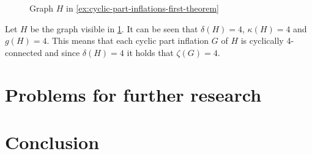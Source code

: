 \documentclass[12pt, twoside]{book}
\begin{document}
\begin{example}\label{ex:cyclic-part-inflations-first-theorem}
	\begin{figure}
		\centering
		\caption{Graph $H$ in \cref{ex:cyclic-part-inflations-first-theorem}}
		\label{fig:cyclic-part-inflations-ex-2-before}
	\end{figure}

	Let $H$ be the graph visible in \cref{fig:cyclic-part-inflations-ex-2-before}. It can be seen that $\delta(H)=4$, $\kappa(H)=4$ and $g(H)=4$. This means that each cyclic part inflation $G$ of $H$ is cyclically 4-connected and since $\delta(H)=4$ it holds that $\zeta(G)=4$.
	
\end{example}


\chapter{Problems for further research}

\chapter*{Conclusion}

\todo{}

\newpage
\thispagestyle{empty}




\end{document}

